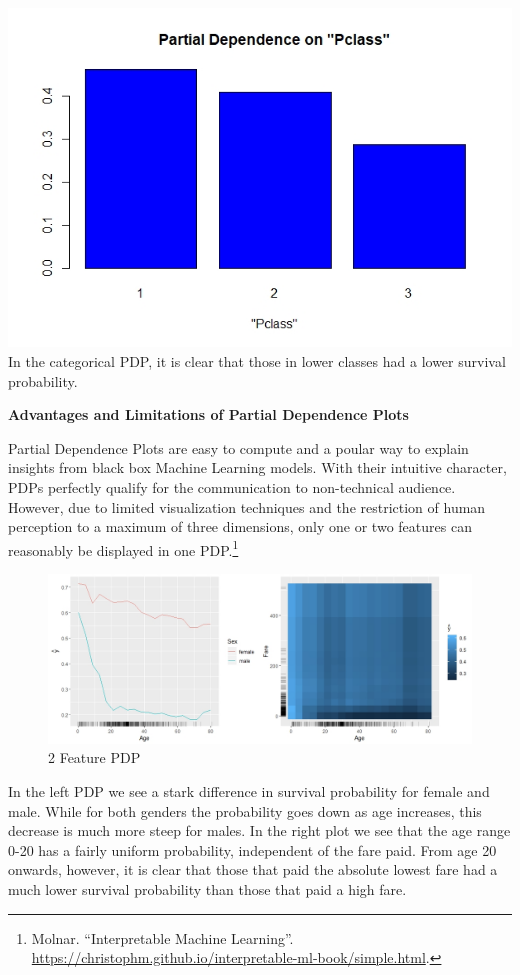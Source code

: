 \documentclass[]{krantz}
\begin{document}
\includegraphics{PDP_Pclass.jpeg} In the categorical PDP, it is clear
that those in lower classes had a lower survival probability.

\textbf{Advantages and Limitations of Partial Dependence Plots}

Partial Dependence Plots are easy to compute and a poular way to explain
insights from black box Machine Learning models. With their intuitive
character, PDPs perfectly qualify for the communication to non-technical
audience. However, due to limited visualization techniques and the
restriction of human perception to a maximum of three dimensions, only
one or two features can reasonably be displayed in one PDP.\footnote{Molnar.
  ``Interpretable Machine Learning''.
  \url{https://christophm.github.io/interpretable-ml-book/simple.html}.}

\begin{figure}
\centering
\includegraphics{2_feature_pdp.jpeg}
\caption{2 Feature PDP}
\end{figure}

In the left PDP we see a stark difference in survival probability for
female and male. While for both genders the probability goes down as age
increases, this decrease is much more steep for males. In the right plot
we see that the age range 0-20 has a fairly uniform probability,
independent of the fare paid. From age 20 onwards, however, it is clear
that those that paid the absolute lowest fare had a much lower survival
probability than those that paid a high fare.
\end{document}
